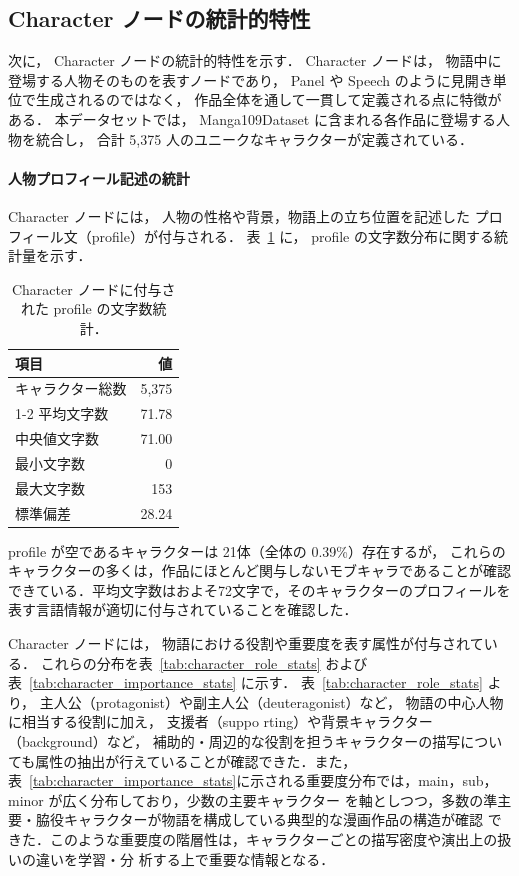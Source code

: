 \documentclass[a4j,12pt,dvipdfmx]{jsreport}
\begin{document}
\subsection{Character ノードの統計的特性}
\label{sec:character_node_stats}
次に，
Character ノードの統計的特性を示す．
Character ノードは，
物語中に登場する人物そのものを表すノードであり，
Panel や Speech のように見開き単位で生成されるのではなく，
作品全体を通して一貫して定義される点に特徴がある．
本データセットでは，
Manga109Dataset に含まれる各作品に登場する人物を統合し，
合計 5{,}375 人のユニークなキャラクターが定義されている．

\paragraph{人物プロフィール記述の統計}
Character ノードには，
人物の性格や背景，物語上の立ち位置を記述した
プロフィール文（profile）が付与される．
表~\ref{tab:character_profile_stats} に，
profile の文字数分布に関する統計量を示す．

\begin{table}[htbp]
   \centering
   \caption{Character ノードに付与された profile の文字数統計．}
   \label{tab:character_profile_stats}
   \begin{tabular}{lr}
      \toprule
      \textbf{項目} & \textbf{値} \\
      \midrule
      キャラクター総数    & 5{,}375    \\
      \cmidrule(lr){1-2}
      平均文字数       & 71.78      \\
      中央値文字数      & 71.00      \\
      最小文字数       & 0          \\
      最大文字数       & 153        \\
      標準偏差        & 28.24      \\
      \bottomrule
   \end{tabular}
\end{table}

profile が空であるキャラクターは
21体（全体の 0.39\%）存在するが，
これらのキャラクターの多くは，作品にほとんど関与しないモブキャラであることが確認できている．平均文字数はおよそ72文字で，そのキャラクターのプロフィールを表す言語情報が適切に付与されていることを確認した．

Character ノードには，
物語における役割や重要度を表す属性が付与されている．
これらの分布を表~\ref{tab:character_role_stats} および
表~\ref{tab:character_importance_stats} に示す．
表~\ref{tab:character_role_stats} より，
主人公（protagonist）や副主人公（deuteragonist）など，
物語の中心人物に相当する役割に加え，
支援者（suppo  rting）や背景キャラクター（background）など，
補助的・周辺的な役割を担うキャラクターの描写についても属性の抽出が行えていることが確認できた．また，表~\ref{tab:character_importance_stats}に示される重要度分布では，main，sub，minor が広く分布しており，少数の主要キャラクター
を軸としつつ，多数の準主要・脇役キャラクターが物語を構成している典型的な漫画作品の構造が確認
できた．このような重要度の階層性は，キャラクターごとの描写密度や演出上の扱いの違いを学習・分
析する上で重要な情報となる．
\end{document}
